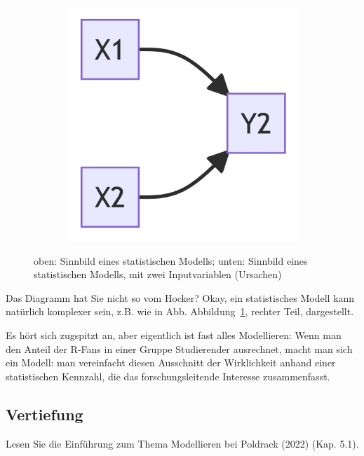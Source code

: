 \documentclass[
  a4paper,
  DIV=11]{scrreprt}
\theoremstyle{definition}
\theoremstyle{remark}
\begin{document}
\begin{figure}

{\centering 

\begin{figure}[H]

{\centering \includegraphics[width=5.5in,height=3.5in]{./Inferenz_files/figure-latex/mermaid-figure-3.png}

}

\end{figure}

}

\caption{\label{fig-xy}oben: Sinnbild eines statistischen Modells;
unten: Sinnbild eines statistischen Modells, mit zwei Inputvariablen
(Ursachen)}

\end{figure}

Das Diagramm hat Sie nicht so vom Hocker? Okay, ein statistisches Modell
kann natürlich komplexer sein, z.B. wie in Abb. Abbildung~\ref{fig-xy},
rechter Teil, dargestellt.

Es hört sich zugspitzt an, aber eigentlich ist fast alles Modellieren:
Wenn man den Anteil der R-Fans in einer Gruppe Studierender ausrechnet,
macht man sich ein Modell: man vereinfacht diesen Ausschnitt der
Wirklichkeit anhand einer statistischen Kennzahl, die das
forschungsleitende Interesse zusammenfasst.

\hypertarget{vertiefung}{%
\subsection{Vertiefung}\label{vertiefung}}

Lesen Sie die Einführung zum Thema Modellieren bei Poldrack (2022) (Kap.
5.1).
\end{document}
